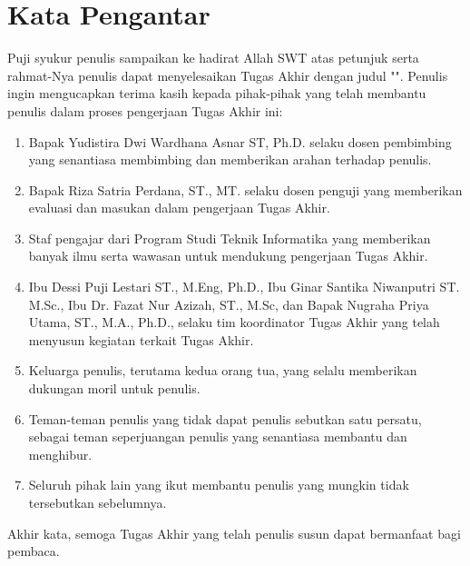 \chapter*{Kata Pengantar}

Puji syukur penulis sampaikan ke hadirat Allah SWT atas petunjuk serta rahmat-Nya
penulis dapat menyelesaikan Tugas Akhir dengan judul "\thetitle".
Penulis ingin mengucapkan terima kasih kepada pihak-pihak yang telah membantu
penulis dalam proses pengerjaan Tugas Akhir ini:

\begin{enumerate}
  \item Bapak Yudistira Dwi Wardhana Asnar ST, Ph.D. selaku dosen pembimbing yang senantiasa membimbing dan memberikan arahan terhadap penulis.
  \item Bapak Riza Satria Perdana, ST., MT. selaku dosen penguji yang memberikan evaluasi dan masukan dalam pengerjaan Tugas Akhir.
  \item Staf pengajar dari Program Studi Teknik Informatika yang memberikan banyak ilmu serta wawasan untuk mendukung pengerjaan Tugas Akhir.
  \item Ibu Dessi Puji Lestari ST., M.Eng, Ph.D., Ibu Ginar Santika Niwanputri ST. M.Sc.,
        Ibu Dr. Fazat Nur Azizah, ST., M.Sc, dan Bapak Nugraha Priya Utama, ST., M.A., Ph.D.,
        selaku tim koordinator Tugas Akhir yang telah
        menyusun kegiatan terkait Tugas Akhir.
  \item Keluarga penulis, terutama kedua orang tua, yang selalu memberikan dukungan moril untuk penulis.
  \item Teman-teman penulis yang tidak dapat penulis sebutkan satu persatu, sebagai teman seperjuangan penulis yang senantiasa membantu dan menghibur.
  \item Seluruh pihak lain yang ikut membantu penulis yang mungkin tidak tersebutkan sebelumnya.
\end{enumerate}

Akhir kata, semoga Tugas Akhir yang telah penulis susun dapat bermanfaat bagi pembaca.